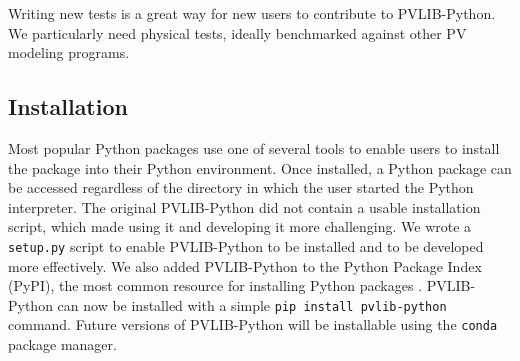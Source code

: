 \documentclass[conference]{IEEEtran}
\begin{document}
Writing new tests is a great way for new users to contribute to PVLIB-Python.
We particularly need physical tests, ideally benchmarked against other PV modeling programs.

\subsection{Installation}

Most popular Python packages use one of several tools to enable users to install the package into their Python environment.
Once installed, a Python package can be accessed regardless of the directory in which the user started the Python interpreter.
The original PVLIB-Python did not contain a usable installation script, which made using it and developing it more challenging.
We wrote a \texttt{setup.py} script to enable PVLIB-Python to be installed and to be developed more effectively.
We also added PVLIB-Python to the Python Package Index (PyPI), the most common resource for installing Python packages \cite{pvlib-pypi}.
PVLIB-Python can now be installed with a simple \texttt{pip install pvlib-python} command.
Future versions of PVLIB-Python will be installable using the \texttt{conda} package manager.
\end{document}
